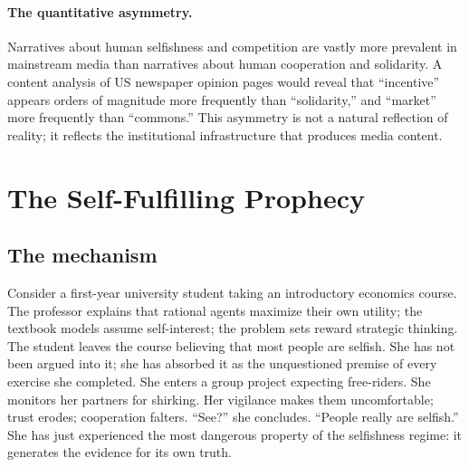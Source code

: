 \paragraph{The quantitative asymmetry.}
Narratives about human selfishness and competition are vastly more prevalent in mainstream media than narratives about human cooperation and solidarity.
A content analysis of US newspaper opinion pages would reveal that ``incentive'' appears orders of magnitude more frequently than ``solidarity,'' and ``market'' more frequently than ``commons.''
This asymmetry is not a natural reflection of reality; it reflects the institutional infrastructure that produces media content.

\section{The Self-Fulfilling Prophecy}
\label{sec:ch21-self-fulfilling}

\subsection{The mechanism}

Consider a first-year university student taking an introductory economics course.
The professor explains that rational agents maximize their own utility; the textbook models assume self-interest; the problem sets reward strategic thinking.
The student leaves the course believing that most people are selfish.
She has not been argued into it; she has absorbed it as the unquestioned premise of every exercise she completed.
She enters a group project expecting free-riders.
She monitors her partners for shirking.
Her vigilance makes them uncomfortable; trust erodes; cooperation falters.
``See?'' she concludes.
``People really are selfish.''
She has just experienced the most dangerous property of the selfishness regime: it generates the evidence for its own truth.

